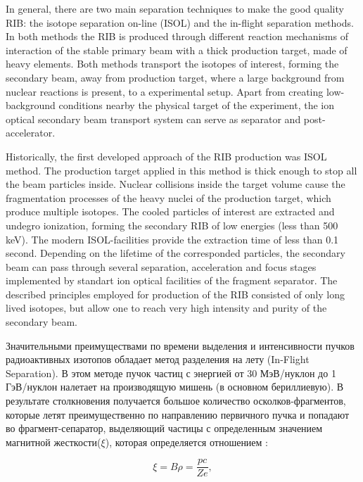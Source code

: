 In general, there are two main separation techniques to make the good quality RIB: the isotope separation on-line (ISOL) and the in-flight separation methods.
In both methods the RIB is produced through different reaction mechanisms of interaction of the stable primary beam with a thick production target, made of heavy elements.
Both methods transport the isotopes of interest, forming the secondary beam, away from production target, where a large background from nuclear reactions is present, to a experimental setup.
Apart from creating low-background conditions nearby the physical target of the experiment, the ion optical secondary beam transport system can serve as separator and post-accelerator.

Historically, the first developed approach of the RIB production was ISOL method. 
The production target applied in this method is thick enough to stop all the beam particles inside.
Nuclear collisions inside the target volume cause the fragmentation processes of the heavy nuclei of the production target, which produce multiple isotopes.
The cooled particles of interest are extracted and undegro ionization, forming the secondary RIB of low energies (less than 500 keV).
The modern ISOL-facilities provide the extraction time of less than 0.1 second.
Depending on the lifetime of the corresponded particles, the secondary beam can pass through several separation, acceleration and focus stages implemented by standart ion optical facilities of the fragment separator.	
The described principles employed for production of the RIB consisted of only long lived isotopes, but allow one to reach very high intensity and purity of the secondary beam.




\newpage

Значительными преимуществами по времени выделения и интенсивности пучков радиоактивных изотопов обладает метод разделения на лету (In-Flight Separation). В этом методе пучок частиц с энергией от 30 МэВ/нуклон до 1 ГэВ/нуклон налетает на производящую мишень (в основном бериллиевую). В результате столкновения получается большое количество осколков-фрагментов, которые летят преимущественно по направлению первичного пучка и попадают во фрагмент-сепаратор, выделяющий частицы с определенным значением магнитной жесткости($\xi$), которая определяется отношением :

\begin{equation}
\label{Mag}
\xi = B \rho =  \frac{pc}{Ze},
\end{equation}

